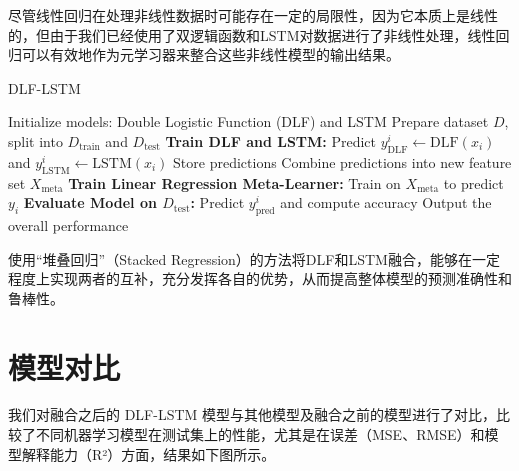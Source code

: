 尽管线性回归在处理非线性数据时可能存在一定的局限性，因为它本质上是线性的，但由于我们已经使用了双逻辑函数和LSTM对数据进行了非线性处理，线性回归可以有效地作为元学习器来整合这些非线性模型的输出结果。
\begin{algorithm}[H] %
\caption{DLF-LSTM}
\begin{algorithmic}[1]
\State Initialize models: Double Logistic Function (DLF) and LSTM
\State Prepare dataset $D$, split into $D_{\text{train}}$ and $D_{\text{test}}$
\State \textbf{Train DLF and LSTM:}
    \State Predict $y_{\text{DLF}}^i \leftarrow \text{DLF}(x_i)$ and $y_{\text{LSTM}}^i \leftarrow \text{LSTM}(x_i)$
    \State Store predictions
\EndFor
\State Combine predictions into new feature set $X_{\text{meta}}$
\State \textbf{Train Linear Regression Meta-Learner:}
\State Train on $X_{\text{meta}}$ to predict $y_i$
\State \textbf{Evaluate Model on $D_{\text{test}}$:}
    \State Predict $y_{\text{pred}}^i$ and compute accuracy
\EndFor
\State Output the overall performance
\end{algorithmic}
\end{algorithm}
使用“堆叠回归”（Stacked Regression）的方法将DLF和LSTM融合，能够在一定程度上实现两者的互补，充分发挥各自的优势，从而提高整体模型的预测准确性和鲁棒性。

\section{模型对比}
我们对融合之后的 DLF-LSTM 模型与其他模型及融合之前的模型进行了对比，比较了不同机器学习模型在测试集上的性能，尤其是在误差（MSE、RMSE）和模型解释能力（R²）方面，结果如下图所示。

